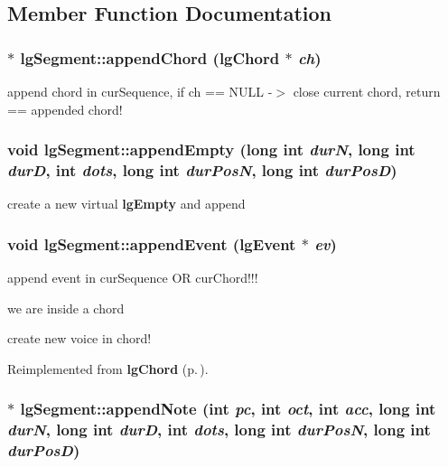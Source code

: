 \subsection{Member Function Documentation}
\subsubsection{ $\ast$ lg\-Segment::append\-Chord ({\bf lg\-Chord} $\ast$ {\em ch})}\label{classlgSegment_a10}


append chord in cur\-Sequence, if ch == NULL -$>$ close current chord, return == appended chord! 

\subsubsection{\setlength{\rightskip}{0pt plus 5cm}void lg\-Segment::append\-Empty (long int {\em dur\-N}, long int {\em dur\-D}, int {\em dots}, long int {\em dur\-Pos\-N}, long int {\em dur\-Pos\-D})\hspace{0.3cm}{\tt  [inline]}}\label{classlgSegment_a8}


create a new virtual {\bf lg\-Empty} and append 

\subsubsection{\setlength{\rightskip}{0pt plus 5cm}void lg\-Segment::append\-Event ({\bf lg\-Event} $\ast$ {\em ev})\hspace{0.3cm}{\tt  [virtual]}}\label{classlgSegment_a6}


append event in cur\-Sequence OR cur\-Chord!!! 

we are inside a chord

create new voice in chord! 

Reimplemented from {\bf lg\-Chord} {\rm (p.\,\pageref{classlgChord_a3})}.
\subsubsection{$\ast$ lg\-Segment::append\-Note (int {\em pc}, int {\em oct}, int {\em acc}, long int {\em dur\-N}, long int {\em dur\-D}, int {\em dots}, long int {\em dur\-Pos\-N}, long int {\em dur\-Pos\-D})\hspace{0.3cm}{\tt  [inline]}}\label{classlgSegment_a9}


